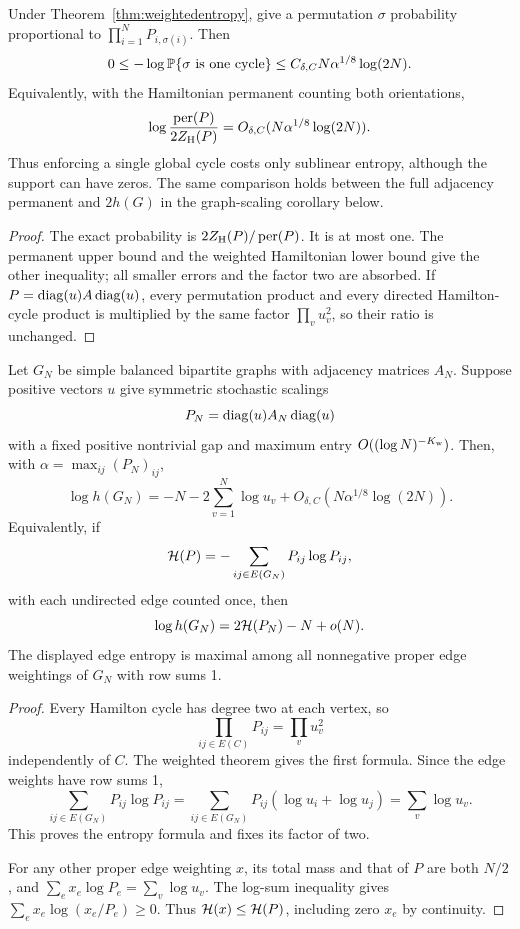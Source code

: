 \begin{corollary}
\label{cor:onecyclecost}
Under Theorem~\ref{thm:weightedentropy}, give a permutation
\(\sigma\) probability proportional to
\(\prod_{i=1}^N P_{i,\sigma(i)}\).
Then
\[
 0\leq-\log\mathbb P\{\sigma\hbox{ is one cycle}\}
       \leq C_{\delta,C}N\alpha^{1/8}\log(2N).
\]
Equivalently, with the Hamiltonian permanent counting both
orientations,
\[
 \log\frac{\operatorname{per}(P)}{2Z_{\rm H}(P)}
          =O_{\delta,C}(N\alpha^{1/8}\log(2N)).
\]
Thus enforcing a single global cycle costs only sublinear
entropy, although the support can have zeros.
The same comparison holds between the full adjacency
permanent and \(2h(G)\) in the graph-scaling corollary below.
\end{corollary}
\begin{proof}
The exact probability is \(2Z_{\rm H}(P)/\operatorname{per}(P)\).
It is at most one. The permanent upper bound and the weighted
Hamiltonian lower bound give the other inequality;
all smaller errors and the factor two are absorbed.
If \(P=\operatorname{diag}(u)A\operatorname{diag}(u)\), every permutation product and
every directed Hamilton-cycle product is multiplied by
the same factor \(\prod_vu_v^2\), so their ratio is unchanged.
\end{proof}

\begin{corollary}
\label{cor:sinkhornentropy}
Let \(G_N\) be simple balanced bipartite graphs with
adjacency matrices \(A_N\).
Suppose positive vectors \(u\) give symmetric stochastic
scalings
\[
 P_N=\operatorname{diag}(u)A_N\operatorname{diag}(u)
\]
with a fixed positive nontrivial gap and maximum entry
\(O((\log N)^{-K_{\rm w}})\).
Then, with \(\alpha=\max_{ij}(P_N)_{ij}\),
\[
 \log h(G_N)=-N-2\sum_{v=1}^N\log u_v
                  +O_{\delta,C}(N\alpha^{1/8}\log(2N)).
\]
Equivalently, if
\[
 {\cal H}(P)=-\sum_{ij\in E(G_N)}P_{ij}\log P_{ij},
\]
with each undirected edge counted once, then
\[
 \log h(G_N)=2{\cal H}(P_N)-N+o(N).
\]
The displayed edge entropy is maximal among all nonnegative
proper edge weightings of \(G_N\) with row sums 1.
\end{corollary}
\begin{proof}
Every Hamilton cycle has degree two at each vertex, so
\[
 \prod_{ij\in E(C)}P_{ij}=\prod_vu_v^2
\]
independently of \(C\).
The weighted theorem gives the first formula.
Since the edge weights have row sums 1,
\[
 \sum_{ij\in E(G_N)}P_{ij}\log P_{ij}
 =\sum_{ij\in E(G_N)}P_{ij}(\log u_i+\log u_j)
 =\sum_v\log u_v.
\]
This proves the entropy formula and fixes its factor of two.

For any other proper edge weighting \(x\), its total mass
and that of \(P\) are both \(N/2\), and
\(\sum_e x_e\log P_e=\sum_v\log u_v\).
The log-sum inequality gives
\(\sum_e x_e\log(x_e/P_e)\geq0\).
Thus \({\cal H}(x)\leq{\cal H}(P)\), including zero \(x_e\)
by continuity.
\end{proof}

